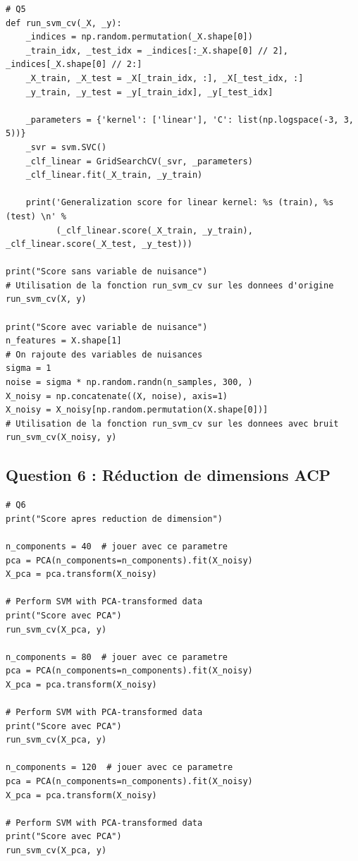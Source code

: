 \documentclass{article}
\begin{document}
\begin{lstlisting}
# Q5
def run_svm_cv(_X, _y):
    _indices = np.random.permutation(_X.shape[0])
    _train_idx, _test_idx = _indices[:_X.shape[0] // 2], _indices[_X.shape[0] // 2:]
    _X_train, _X_test = _X[_train_idx, :], _X[_test_idx, :]
    _y_train, _y_test = _y[_train_idx], _y[_test_idx]

    _parameters = {'kernel': ['linear'], 'C': list(np.logspace(-3, 3, 5))}
    _svr = svm.SVC()
    _clf_linear = GridSearchCV(_svr, _parameters)
    _clf_linear.fit(_X_train, _y_train)

    print('Generalization score for linear kernel: %s (train), %s (test) \n' %
          (_clf_linear.score(_X_train, _y_train), _clf_linear.score(_X_test, _y_test)))

print("Score sans variable de nuisance")
# Utilisation de la fonction run_svm_cv sur les donnees d'origine
run_svm_cv(X, y)

print("Score avec variable de nuisance")
n_features = X.shape[1]
# On rajoute des variables de nuisances
sigma = 1
noise = sigma * np.random.randn(n_samples, 300, )
X_noisy = np.concatenate((X, noise), axis=1)
X_noisy = X_noisy[np.random.permutation(X.shape[0])]
# Utilisation de la fonction run_svm_cv sur les donnees avec bruit
run_svm_cv(X_noisy, y)
\end{lstlisting}

\subsection*{Question 6 : Réduction de dimensions ACP}

\begin{lstlisting}
# Q6
print("Score apres reduction de dimension")

n_components = 40  # jouer avec ce parametre
pca = PCA(n_components=n_components).fit(X_noisy)
X_pca = pca.transform(X_noisy)

# Perform SVM with PCA-transformed data
print("Score avec PCA")
run_svm_cv(X_pca, y)

n_components = 80  # jouer avec ce parametre
pca = PCA(n_components=n_components).fit(X_noisy)
X_pca = pca.transform(X_noisy)

# Perform SVM with PCA-transformed data
print("Score avec PCA")
run_svm_cv(X_pca, y)

n_components = 120  # jouer avec ce parametre
pca = PCA(n_components=n_components).fit(X_noisy)
X_pca = pca.transform(X_noisy)

# Perform SVM with PCA-transformed data
print("Score avec PCA")
run_svm_cv(X_pca, y)
\end{lstlisting}
\end{document}
